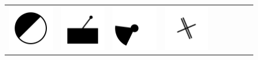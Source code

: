 \documentclass[doc]{apa6}
\newcommand{\stimulusscale}{.1}
\begin{document}
\begin{figure}[p]
\begin{center}
\begin{tabular}{c|cccccccc}
\includegraphics[scale=\stimulusscale]{./set8stim55.png} &
\includegraphics[scale=\stimulusscale]{./set9stim55.png} &
\includegraphics[scale=\stimulusscale]{./set10stim55.png} &
\includegraphics[scale=\stimulusscale]{./set11stim55.png} &

\end{tabular}
\end{center}
\end{figure}
\end{document}
